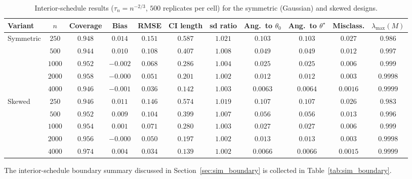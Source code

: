 \documentclass[11pt]{article}
\theoremstyle{definition}
\theoremstyle{plain}
\begin{document}
\begin{table}
  \centering
  \caption{Interior-schedule results ($\tau_n=n^{-2/3}$, $500$ replicates per cell) for the symmetric (Gaussian) and skewed designs.}
  \begin{adjustbox}{max width=\textwidth}
  \begin{tabular}{l c ccccc cc cc}
    \toprule
    Variant & $n$ & Coverage & Bias & RMSE & CI length & sd ratio & Ang.\ to $\theta_0$ & Ang.\ to $\theta^\star$ & Misclass. & $\lambda_{\max}(M)$ \\
    \midrule
    \multirow{5}{*}{Symmetric}
      & $250$  & $0.948$ & $0.014$  & $0.151$ & $0.587$ & $1.021$ & $0.103$  & $0.103$  & $0.027$  & $0.986$ \\
      & $500$  & $0.944$ & $0.010$  & $0.108$ & $0.407$ & $1.008$ & $0.049$  & $0.049$  & $0.012$  & $0.997$ \\
      & $1000$ & $0.952$ & $-0.002$ & $0.068$ & $0.286$ & $1.004$ & $0.025$  & $0.025$  & $0.006$  & $0.999$ \\
      & $2000$ & $0.958$ & $-0.000$ & $0.051$ & $0.201$ & $1.002$ & $0.012$  & $0.012$  & $0.003$  & $0.9998$ \\
      & $4000$ & $0.946$ & $-0.001$ & $0.036$ & $0.142$ & $1.003$ & $0.0063$ & $0.0064$ & $0.0016$ & $0.9999$ \\
    \midrule
    \multirow{5}{*}{Skewed}
      & $250$  & $0.946$ & $0.011$  & $0.146$ & $0.574$ & $1.019$ & $0.107$  & $0.107$  & $0.026$  & $0.983$ \\
      & $500$  & $0.952$ & $0.009$  & $0.104$ & $0.399$ & $1.007$ & $0.056$  & $0.056$  & $0.013$  & $0.996$ \\
      & $1000$ & $0.954$ & $0.001$  & $0.071$ & $0.280$ & $1.003$ & $0.027$  & $0.027$  & $0.006$  & $0.999$ \\
      & $2000$ & $0.956$ & $-0.000$ & $0.050$ & $0.197$ & $1.002$ & $0.013$  & $0.013$  & $0.003$  & $0.9998$ \\
      & $4000$ & $0.974$ & $0.004$  & $0.034$ & $0.139$ & $1.002$ & $0.0066$ & $0.0066$ & $0.0015$ & $0.9999$ \\
    \bottomrule
  \end{tabular}
  \end{adjustbox}
  \label{tab:sim_effect_full}
\end{table}

The interior-schedule boundary summary discussed in Section~\ref{sec:sim_boundary} is collected in Table~\ref{tab:sim_boundary}.
\end{document}
